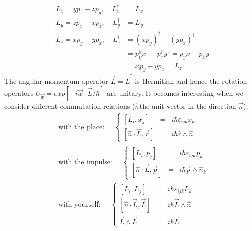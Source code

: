 \begin{equation}
\begin{aligned} 
    L_{x}=y p_{z}-z p_{y}, \quad L_{x}^{\dagger}&=L_{x} \\ 
    L_{y}=z p_{x}-x p_{z}, \quad L_{y}^{\dagger}&=L_{y} \\ 
    L_{z}=x p_{y}-y p_{x}, \quad L_{z}^{\dagger}&=\left(x p_{y}\right)^{\dagger}-\left(y p_{x}\right)^{\dagger} \\ 
    &=p_{y}^{\dagger} x^{\dagger}-p_{x}^{\dagger} y^{\dagger}=p_{y} x-p_{x} y \\ &=x p_{y}-y p_{x}=L_{z} \end{aligned}
\end{equation}
The angular momentum operator $\vec{L} = \vec{L}^{\dagger}$ is Hermitian and hence the rotation operators $U_{\vec{w}}=exp[-i\vec{w}\cdot\vec{L}/\hbar]$ are unitary. It becomes interesting when we consider different commutation relations ($\hat{n}$ ​​the unit vector in the direction $\vec{n}$),
\begin{eqnarray}
    \text { with the place: }  \quad \left\{\begin{array}{lcl}
            {\left[L_{i}, x_{j}\right]} & {=} & {i \hbar \varepsilon_{i j k} x_{k}} \\ 
            {\left[\hat{n} \cdot \hat{L}, \vec{r}\right]} & {=} & {i \hbar \hat{r} \wedge \hat{n}}
        \end{array}\right.\\
    \text { with the impulse: } \quad \left\{\begin{array}{lcl}
            {\left[L_{i}, p_{j}\right]} & {=} & {i \hbar \varepsilon_{i j k} p_{k}} \\ {[\hat{n} \cdot \vec{L}, \vec{p}]} & {=} & {i \hbar \vec{p} \wedge \hat{n}_{k}}
        \end{array}\right.\\
    \text { with yourself: } \quad \left\{\begin{array}{lcl}
            {\left[L_{i}, L_{j}\right]} & {=} & {i \hbar \varepsilon_{i j k} L_{k}} \\ 
            {\left[\hat{n} \cdot \vec{L}, \vec{L}\right]} & {=} & {i \hbar \vec{L} \wedge \hat{n}} \\ {\vec{L} \wedge \vec{L}} & {=} & {i \hbar \vec{L}}
        \end{array}\right.
\end{eqnarray}

